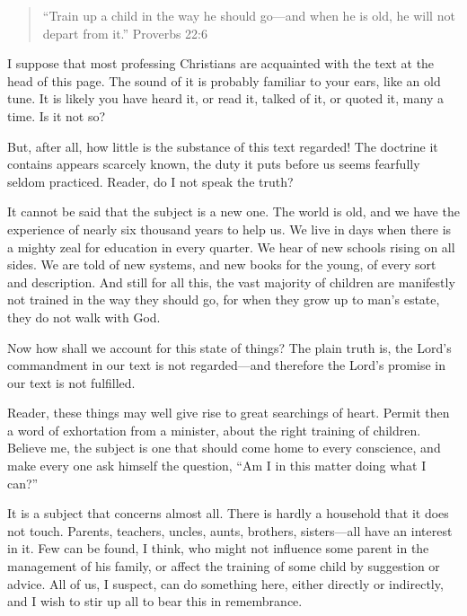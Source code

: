 \documentclass[
]{book}
\begin{document}
\begin{quote}
``Train up a child in the way he should go---and when he is old, he will not depart from it.'' Proverbs 22:6
\end{quote}

I suppose that most professing Christians are acquainted with the text at the head of this page. The sound of it is probably familiar to your ears, like an old tune. It is likely you have heard it, or read it, talked of it, or quoted it, many a time. Is it not so?

But, after all, how little is the substance of this text regarded! The doctrine it contains appears scarcely known, the duty it puts before us seems fearfully seldom practiced. Reader, do I not speak the truth?

It cannot be said that the subject is a new one. The world is old, and we have the experience of nearly six thousand years to help us. We live in days when there is a mighty zeal for education in every quarter. We hear of new schools rising on all sides. We are told of new systems, and new books for the young, of every sort and description. And still for all this, the vast majority of children are manifestly not trained in the way they should go, for when they grow up to man's estate, they do not walk with God.

Now how shall we account for this state of things? The plain truth is, the Lord's commandment in our text is not regarded---and therefore the Lord's promise in our text is not fulfilled.

Reader, these things may well give rise to great searchings of heart. Permit then a word of exhortation from a minister, about the right training of children. Believe me, the subject is one that should come home to every conscience, and make every one ask himself the question, ``Am I in this matter doing what I can?''

It is a subject that concerns almost all. There is hardly a household that it does not touch. Parents, teachers, uncles, aunts, brothers, sisters---all have an interest in it. Few can be found, I think, who might not influence some parent in the management of his family, or affect the training of some child by suggestion or advice. All of us, I suspect, can do something here, either directly or indirectly, and I wish to stir up all to bear this in remembrance.
\end{document}
